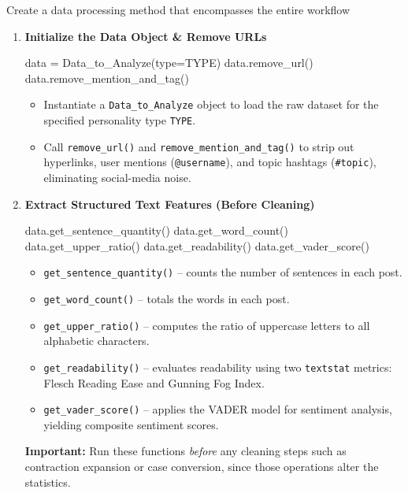 \documentclass[12pt]{article}
\numberwithin{figure}{section}  %
\begin{document}
Create a data processing method that encompasses the entire workflow
\begin{enumerate}
\item \textbf{Initialize the Data Object \& Remove URLs}

\begin{python}
data = Data_to_Analyze(type=TYPE)
data.remove_url()
data.remove_mention_and_tag()
\end{python}

\begin{itemize}
  \item Instantiate a \texttt{Data\_to\_Analyze} object to load the raw dataset for the specified personality type \texttt{TYPE}.
  \item Call \texttt{remove\_url()} and \texttt{remove\_mention\_and\_tag()} to strip out hyperlinks, user mentions (\texttt{@username}), and topic hashtags (\texttt{\#topic}), eliminating social-media noise.
\end{itemize}

\item \textbf{Extract Structured Text Features (Before Cleaning)}

\begin{python}
data.get_sentence_quantity()
data.get_word_count()
data.get_upper_ratio()
data.get_readability()
data.get_vader_score()
\end{python}

\begin{itemize}
  \item \texttt{get\_sentence\_quantity()} – counts the number of sentences in each post.
  \item \texttt{get\_word\_count()} – totals the words in each post.
  \item \texttt{get\_upper\_ratio()} – computes the ratio of uppercase letters to all alphabetic characters.
  \item \texttt{get\_readability()} – evaluates readability using two \texttt{textstat} metrics: Flesch Reading Ease and Gunning Fog Index.
  \item \texttt{get\_vader\_score()} – applies the VADER model for sentiment analysis, yielding composite sentiment scores.
\end{itemize}

\textbf{Important:} Run these functions \emph{before} any cleaning steps such as contraction expansion or case conversion, since those operations alter the statistics.


\end{enumerate}
\end{document}
